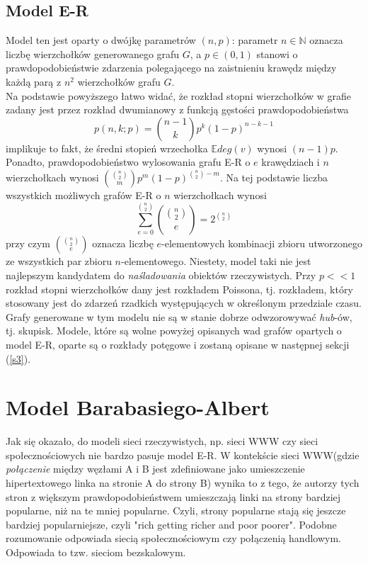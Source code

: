 \documentclass{article}
\begin{document}
\subsection{Model E-R}
	Model ten jest oparty o dwójkę parametrów $(n, p)$: parametr $n \in \mathbb{N}$ oznacza liczbę wierzchołków generowanego grafu $G$, a $p \in
	(0, 1)$ stanowi o prawdopodobieństwie zdarzenia polegającego na zaistnieniu krawędz między każdą parą z $n^2$ wierzchołków grafu $G$. \\
	Na podstawie powyższego łatwo widać, że rozkład stopni wierzchołków w grafie zadany jest przez rozkład dwumianowy z funkcją
	gęstości prawdopodobieństwa 
	\begin{equation}
		p(n,k; p) = \binom{n-1}{k}p^{k}(1-p)^{n-k - 1}
	\end{equation}
	implikuje to fakt, że średni stopień wrzechołka $\mathbb{E}deg(v)$ wynosi $(n-1)p$. Ponadto, prawdopodobieństwo wylosowania grafu E-R o $e$ krawędziach i $n$ wierzchołkach wynosi
	$\binom{\binom{n}{2}}{m}p^{m}(1-p)^{\binom{n}{2} - m}$. Na tej podstawie liczba wszystkich możliwych grafów E-R o $n$ wierzchołkach wynosi
	\begin{equation}
		\sum_{e = 0}^{\binom{n}{2}} \binom{\binom{n}{2}}{e} = 2^{\binom{n}{2}}
	\end{equation}
	przy czym $\binom{\binom{n}{2}}{e}$ oznacza liczbę $e$-elementowych kombinacji zbioru utworzonego ze wszystkich par zbioru $n$-elementowego. \newline
	Niestety, model taki nie jest najlepszym kandydatem do \textit{naśladowania} obiektów rzeczywistych. Przy $p << 1$ rozkład stopni wierzchołków dany jest rozkładem Poissona, tj. rozkładem, który stosowany jest do zdarzeń rzadkich występujących w określonym przedziale czasu. Grafy generowane w tym modelu nie są w stanie dobrze odwzorowywać \textit{hub}-ów, tj. skupisk. \newline
	Modele, które są wolne powyżej opisanych wad grafów opartych o model E-R, oparte są o rozkłady potęgowe i zostaną opisane w następnej sekcji (\ref{s3}).
\section{Model Barabasiego-Albert \label{s3}}
	Jak się okazało, do modeli sieci rzeczywistych, np. sieci WWW czy sieci społecznościowych nie bardzo pasuje model E-R. W kontekście sieci WWW(gdzie \textit{połączenie} między węzłami A i B jest zdefiniowane jako umieszczenie hipertextowego linka na stronie A do strony B) wynika to z tego, że autorzy tych stron z większym prawdopodobieństwem umieszczają linki na strony bardziej popularne, niż na te mniej popularne. Czyli, strony popularne stają się jeszcze bardziej popularniejsze, czyli "rich getting richer and poor poorer". Podobne rozumowanie odpowiada siecią społecznościowym czy połączenią handlowym. Odpowiada to tzw. sieciom bezskalowym.\cite{Fronczak2}
\end{document}
